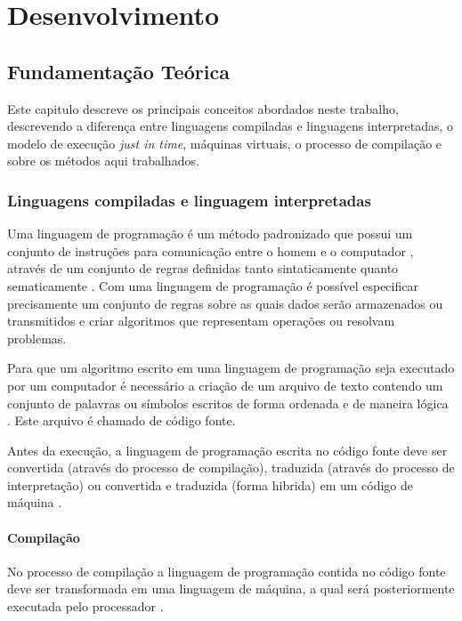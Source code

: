 \part{Desenvolvimento}

\chapter[Fundamentação Teórica]{Fundamentação Teórica}

Este capitulo descreve os principais conceitos abordados neste trabalho,
 descrevendo a diferença entre linguagens compiladas e linguagens interpretadas,
 o modelo de execução \textit{just in time}, máquinas virtuais,
 o processo de compilação e sobre os métodos aqui trabalhados.
 
\section{Linguagens compiladas e linguagem interpretadas}

Uma linguagem de programação é um método padronizado que possui
 um conjunto de instruções para comunicação entre o homem
 e o computador \cite{ref1}, através de um conjunto de regras
 definidas tanto sintaticamente quanto sematicamente \cite{ref2}.
 Com uma linguagem
 de programação é possível especificar precisamente um conjunto de regras
 sobre  as quais dados serão armazenados ou transmitidos e criar algoritmos
 que representam operações ou resolvam problemas.
    
Para que um algoritmo escrito em uma linguagem de programação seja executado 
por um computador é necessário a criação de um arquivo de texto contendo um 
conjunto de palavras ou símbolos escritos de forma ordenada  e de maneira 
lógica \cite[pág. 3]{ref3}. Este arquivo é chamado de código fonte.
    
Antes da execução, a linguagem de programação escrita no código fonte deve
 ser convertida (através do processo de compilação), traduzida (através do 
processo de interpretação) ou convertida e traduzida (forma hibrida) em um 
código de máquina \cite[pág. 2]{ref4}.

\subsection{Compilação}
\label{Compilação}

No processo de compilação a linguagem de programação contida no código fonte
 deve ser transformada em uma linguagem de máquina, a qual será posteriormente
 executada pelo processador \cite{ref2}. 

